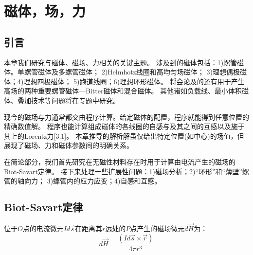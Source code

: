\chapter{磁体，场，力}
\section{引言}
本章我们研究与磁体、磁场、力相关的关键主题。
涉及到的磁体包括：1)螺管磁体。单螺管磁体及多螺管磁体；
2)Helmhotz线圈和高均匀场磁体；
3)理想偶极磁体；4)理想四极磁体；
5)跑道线圈；6)理想环形磁体。
将会论及的还有用于产生高场的两种重要螺管磁体---Bitter磁体和混合磁体。
其他诸如负载线、最小体积磁体、叠加技术等问题将在专题中研究。

现今的磁场与力通常都交由程序计算。给定磁体的配置，程序就能得到任意位置的精确数值解。
程序也能计算组成磁体的各线圈的自感与及其之间的互感以及施于其上的Lorentz力[3.1]。
本章推导的解析解虽仅给出特定位置(如中心)的场值，但展现了磁场、力和磁体参数间的明确关系。

在简论部分，我们首先研究在无磁性材料存在时用于计算由电流产生的磁场的Biot-Savart定律。
接下来处理一些扩展性问题：1)磁场分析；2)``环形''和``薄壁''螺管的轴向力；
3)螺管内的应力应变；4)自感和互感。

\section{Biot-Savart定律}
位于$O$点的电流微元$Id\vec{s}$在距离其$r$远处的$P$点产生的磁场微元$d\vec{H}$为：
\begin{equation}\label{eqn:bs law}
  d\vec{H}=\frac{(Id\vec{s}\times \vec{r})}{4\pi r^3}
\end{equation}

